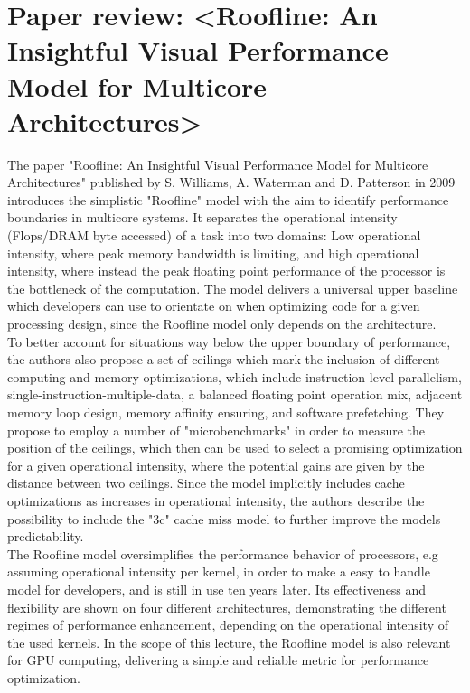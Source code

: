 \section{Paper review: <Roofline: An Insightful Visual Performance Model for Multicore Architectures>}
The paper "Roofline: An Insightful Visual Performance Model for Multicore Architectures" published by S. Williams, A. Waterman and D. Patterson in 2009 introduces the simplistic "Roofline" model with the aim to identify performance boundaries in multicore systems. It separates the operational intensity (Flops/DRAM byte accessed) of a task into two domains: Low operational intensity, where peak memory bandwidth is limiting, and high operational intensity, where instead the peak floating point performance of the processor is the bottleneck of the computation. The model delivers a universal upper baseline which developers can use to orientate on when optimizing code for a given processing design, since the Roofline model only depends on the architecture.\\
To better account for situations way below the upper boundary of performance, the authors also propose a set of ceilings which mark the inclusion of different computing and memory optimizations, which include instruction level parallelism, single-instruction-multiple-data, a balanced floating point operation mix, adjacent memory loop design, memory affinity ensuring, and software prefetching. They propose to employ a number of "microbenchmarks" in order to measure the position of the ceilings, which then can be used to select a promising optimization for a given operational intensity, where the potential gains are given by the distance between two ceilings. Since the model implicitly includes cache optimizations as increases in operational intensity, the authors describe the possibility to include the "3c" cache miss model to further improve the models predictability.\\
The Roofline model oversimplifies the performance behavior of processors, e.g assuming operational intensity per kernel, in order to make a easy to handle model for developers, and is still in use ten years later. Its effectiveness and flexibility are shown on four different architectures, demonstrating the different regimes of performance enhancement, depending on the operational intensity of the used kernels. In the scope of this lecture, the Roofline model is also relevant for GPU computing, delivering a simple and reliable metric for performance optimization.





